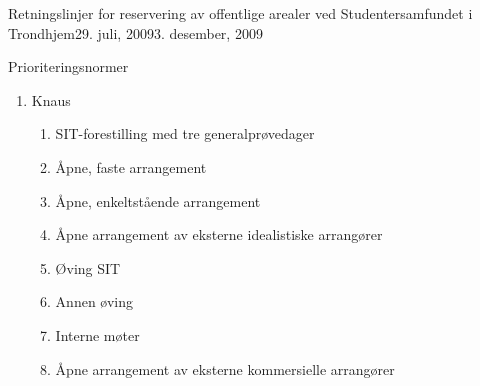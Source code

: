 \begin{instruks}{Retningslinjer for reservering av offentlige arealer
    ved Studentersamfundet i Trondhjem}{29. juli, 2009}{3. desember, 2009}
\begin{instruksledd}{Prioriteringsnormer}
\begin{enumerate}
\begin{enumerate}
\begin{enumerate}
                            \item Åpne, faste arrangement1
                            \item Fotball
                            \item Åpne, enkeltstående arrangement2
                            \item Åpne arrangement av eksterne idealistiske arrangører (utlån)
                            \item Øvinger
                            \item Faste interne arrangement3
                            \item Åpne arrangement av eksterne kommersielle arrangører (utleie)
                            \item Lukkete arrangement av eksterne arrangører (utleie)
                            \item  Interne møter
                            \item Interne fester
                        \end{enumerate}
                        1 Med ”åpne, faste arrangement” menes regelmessige
                        arrangementer/konsepter som er åpne for alle og som
                        arrangeres av en av Samfundets gjenger.
                        2 Med ”åpne, enkeltstående arrangement” menes arrangementer
                        som er åpne for alle og som arrangeres av en
                        av Samfundets gjenger, men som ikke faller inn under noe fast,
                        jevnlig konsept.
                        3 For eksempel Mingle Vingle.
                    \item Knaus
                        \begin{enumerate}
                            \item  SIT-forestilling med tre generalprøvedager
                            \item  Åpne, faste arrangement
                            \item  Åpne, enkeltstående arrangement
                            \item  Åpne arrangement av eksterne idealistiske arrangører
                            \item  Øving SIT
                            \item Annen øving
                            \item Interne møter
                            \item Åpne arrangement av eksterne kommersielle arrangører

\end{enumerate}
\end{enumerate}
\end{enumerate}
\end{instruksledd}
\end{instruks}
